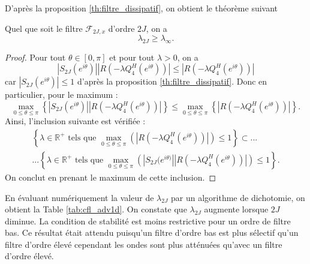 D'après la proposition \ref{th:filtre_dissipatif}, on obtient le théorème suivant
\begin{theoreme}
Quel que soit le filtre $\mathcal{F}_{2J,x}$ d'ordre $2J$, on a 
\begin{equation}
\lambda_{2J} \geq \lambda_{\infty}.
\end{equation}
\end{theoreme}

\begin{proof}
Pour tout $\theta \in [0,\pi]$ et pour tout $\lambda >0$, on a 
\begin{equation}
|S_{2J}(e^{i \theta})||R(-\lambda Q_4^H(e^{i \theta}))| \leq  |R(-\lambda Q_4^H(e^{i \theta}))|
\end{equation}
car $|S_{2J}(e^{i \theta})| \leq 1$ d'après la proposition \ref{th:filtre_dissipatif}. Donc en particulier, pour le maximum :
\begin{equation}
\max_{0\leq \theta \leq \pi} \left\lbrace |S_{2J}(e^{i \theta})||R(-\lambda Q_4^H(e^{i \theta}))| \right\rbrace \leq  \max_{0\leq \theta \leq \pi} \left\lbrace|R(-\lambda Q_4^H(e^{i \theta}))|\right\rbrace.
\end{equation}
Ainsi, l'inclusion suivante est vérifiée :
\begin{multline}
\left\lbrace \lambda \in \mathbb{R}^+ \text{ tels que } \max_{0 \leq \theta \leq \pi} \left( |R(-\lambda Q_4^H (e^{i \theta}))| \right) \leq 1 \right\rbrace \subset ...\\
...
\left\lbrace \lambda \in \mathbb{R}^+ \text{ tels que } \max_{0 \leq \theta \leq \pi} \left( |S_{2J}(e^{i \theta)}||R(-\lambda Q_4^H (e^{i \theta}))| \right) \leq 1 \right\rbrace.
\end{multline}
On conclut en prenant le maximum de cette inclusion.
\end{proof}

En évaluant numériquement la valeur de $\lambda_{2J}$ par un algorithme de dichotomie, on obtient la Table \ref{tab:cfl_adv1d}. On constate que $\lambda_{2J}$ augmente lorsque $2J$ diminue. La condition de stabilité est moins restrictive pour un ordre de filtre bas. Ce résultat était attendu puisqu'un filtre d'ordre bas est plus sélectif qu'un filtre d'ordre élevé cependant les ondes sont plus atténuées qu'avec un filtre d'ordre élevé.

